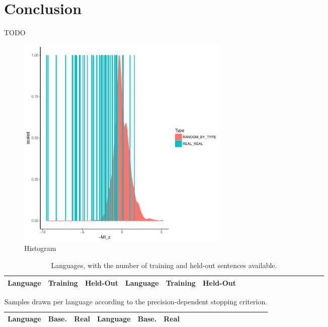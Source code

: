 \documentclass[11pt,letterpaper]{article}
\begin{document}



\section{Conclusion}

TODO





\appendix






\begin{figure}[!htbp]
\includegraphics[width=0.5\textwidth]{../code/visualize_neural/figures/full-REAL-listener-surprisal-memory-HIST_z_byMem_onlyWordForms_boundedVocab.pdf}
\caption{Histogram}\label{fig:hist-real}
\end{figure}


\begin{table}[!htbp]
\begin{longtable}{l|ll||l|llllllllllllll}
	Language & Training & Held-Out & 	Language & Training & Held-Out\\ \hline

\end{longtable}
	\caption{Languages, with the number of training and held-out sentences available.}\label{tab:corpora}
\end{table}

\begin{table}[!htbp]
\begin{longtable}{l|ll||l|llllllllllllll}
	Language & Base. & Real & Language & Base. & Real \\ \hline

\end{longtable}
	\caption{Samples drawn per language according to the precision-dependent stopping criterion.}\label{tab:samples}
\end{table}
\end{document}
